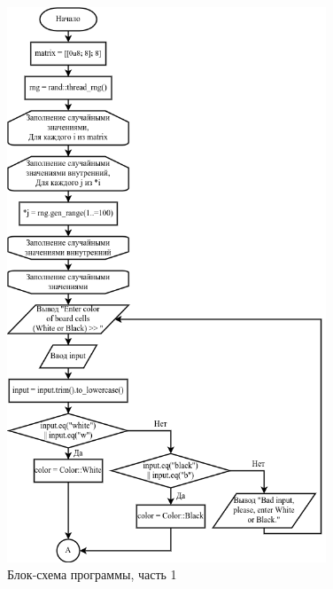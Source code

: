 \documentclass[14pt, a4paper]{extreport}
\begin{document}
\begin{figure}[H]
	\caption{Блок-схема программы, часть 1}
	\label{fig:scheme-main-part1}
	\includegraphics[width=0.85\textwidth]{scheme-main-part1}
\end{figure}
\end{document}
